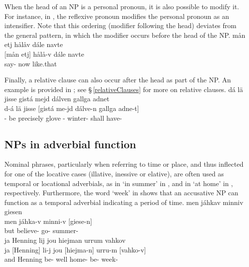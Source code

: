 When the head of an NP is a personal pronoun, it is also possible to modify it. For instance, in , the  reflexive pronoun  modifies the  personal pronoun  as an intensifier. Note that this ordering (modifier following the head) deviates from the general pattern, in which the modifier occurs before the head of the NP. 
\ea\label{NPstructureProEx3}%
\glll	mån etj hålåv dále navte\\
	{[mån} {etj]\subNP} hålå-v dále navte\\
	 \BS{} say- now like.that\\\nopagebreak
{}	
\z

Finally, a relative clause can also occur after the head as part of the NP. An example is provided in ; see §\,\ref{relativeClauses} for more on relative clauses. 
\ea\label{NPstructureRelClEx1}%
\glll	dá lä jisse gistá mejd dálven gallga adnet\\
	d-á lä jisse {[gistá} me-jd dálve-n gallga {adne-t]\subNP}\\
	\BS{}- be\BS{} precisely glove\BS{} - winter- shall\BS{} have-\\\nopagebreak
{}	
\z


\subsection{NPs in adverbial function}\label{ADVnouns}
Nominal phrases, %
particularly when referring to time or place, and thus inflected for one of the locative cases (illative, inessive or elative), are often used as temporal or locational adverbials, as in  ‘in summer’ in , and in  ‘at home’ in , respectively. Furthermore, the word  ‘week’ in  shows that an accusative NP can function as a temporal adverbial indicating a period of time. 
\ea\label{ADVnounsEx1}%
\glll	men jáhkav minniv giesen\\
	men jáhka-v minni-v {[giese-n]\subNP}\\
	but believe- go- summer-\\\nopagebreak
{}	
\z
\ea\label{ADVnounsEx2}
\glll	ja Henning lij jou hiejman urrum vahkov\\
	ja {[Henning]\subNP{}} li-j jou {[hiejma-n]\subNP{}} urru-m {[vahko-v]\subNP{}}\\
	and Henning\BS{} be- well home- be- week-\\\nopagebreak
{}	
\z

